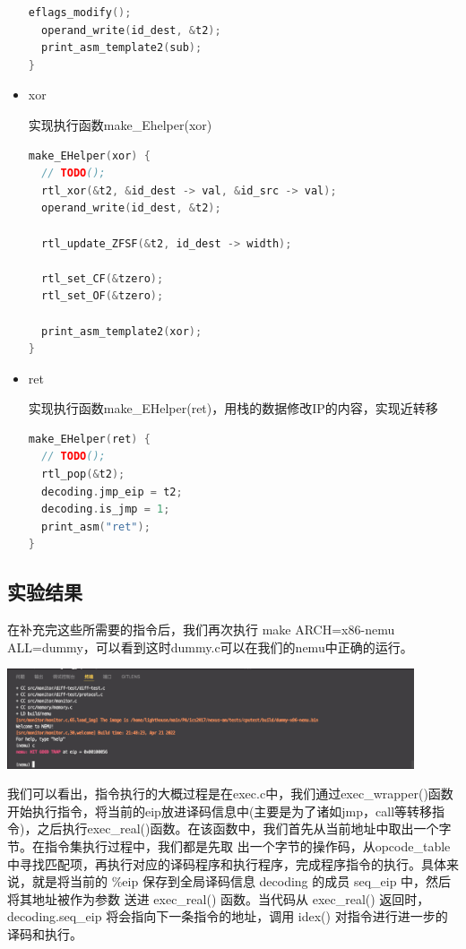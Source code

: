 \documentclass[UTF8,a4paper,10pt]{ctexart}
\begin{document}
\begin{itemize}
\begin{lstlisting}[language = C]
  eflags_modify();
  operand_write(id_dest, &t2);
  print_asm_template2(sub);
}
\end{lstlisting}

  \item xor
  
  实现执行函数make\_Ehelper(xor)
  \begin{lstlisting}[language = C]
make_EHelper(xor) {
  // TODO();
  rtl_xor(&t2, &id_dest -> val, &id_src -> val);
  operand_write(id_dest, &t2);

  rtl_update_ZFSF(&t2, id_dest -> width);

  rtl_set_CF(&tzero);
  rtl_set_OF(&tzero);

  print_asm_template2(xor);
}
\end{lstlisting}

  \item ret
  
  实现执行函数make\_EHelper(ret)，用栈的数据修改IP的内容，实现近转移
  \begin{lstlisting}[language = C]
make_EHelper(ret) {
  // TODO();
  rtl_pop(&t2);
  decoding.jmp_eip = t2;
  decoding.is_jmp = 1;
  print_asm("ret");
}
\end{lstlisting}
\end{itemize}

\subsection{实验结果}
在补充完这些所需要的指令后，我们再次执行 make ARCH=x86-nemu ALL=dummy，可以看到这时dummy.c可以在我们的nemu中正确的运行。
\begin{center}
\includegraphics[width=0.9\textwidth]{dummy.png}
\end{center}


我们可以看出，指令执行的大概过程是在exec.c中，我们通过exec\_wrapper()函数开始执行指令，将当前的eip放进译码信息中(主要是为了诸如jmp，call等转移指令)，之后执行exec\_real()函数。在该函数中，我们首先从当前地址中取出一个字节。在指令集执行过程中，我们都是先取 出一个字节的操作码，从opcode\_table中寻找匹配项，再执行对应的译码程序和执行程序，完成程序指令的执行。具体来说，就是将当前的 \%eip 保存到全局译码信息 decoding 的成员 seq\_eip 中，然后将其地址被作为参数 送进 exec\_real() 函数。当代码从 exec\_real() 返回时， decoding.seq\_eip 将会指向下一条指令的地址，调用 idex() 对指令进行进一步的译码和执行。
\end{document}
